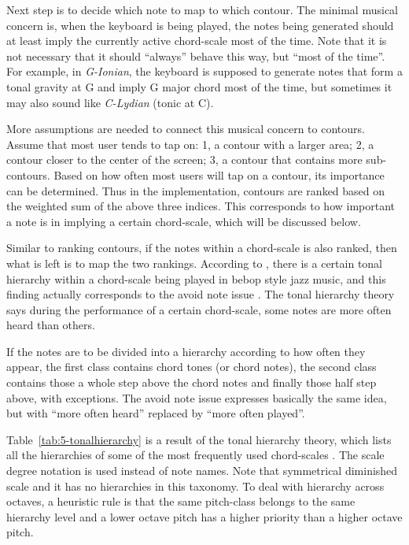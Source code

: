 Next step is to decide which note to map to which contour. The minimal musical concern is, when the keyboard is being played, the notes being generated should at least imply the currently active chord-scale most of the time. Note that it is not necessary that it should ``always'' behave this way, but ``most of the time''. For example, in \textit{G-Ionian}, the keyboard is supposed to generate notes that form a tonal gravity at G and imply G major chord most of the time, but sometimes it may also sound like \textit{C-Lydian} (tonic at C).

More assumptions are needed to connect this musical concern to contours. Assume that most user tends to tap on: 1, a contour with a larger area; 2, a contour closer to the center of the screen; 3, a contour that contains more sub-contours. Based on how often most users will tap on a contour, its importance can be determined. Thus in the implementation, contours are ranked based on the weighted sum of
the above three indices. This corresponds to how important a note is in implying a certain chord-scale, which will be discussed below.

Similar to ranking contours, if the notes within a chord-scale is also ranked, then what is left is to map the two rankings. According to \cite{jarvinen1995tonal}, there is a certain tonal hierarchy within a chord-scale being played in bebop style jazz music, and this finding actually corresponds to the avoid note issue \cite{nettles1987harmony}. The tonal hierarchy theory says during the performance of a certain chord-scale, some notes are more often heard than others.

If the notes are to be divided into a hierarchy according to how often they appear, the first class contains chord tones (or chord notes), the second class contains those a whole step above the chord notes and finally those half step above, with exceptions. The avoid note issue expresses basically the same idea, but with ``more often heard'' replaced by ``more often played''.

Table~\ref{tab:5-tonalhierarchy} is a result of the tonal hierarchy theory, which lists all the hierarchies \cite{nettles1987harmony} of some of the most frequently used chord-scales \cite{burtonJazzImpro}. The scale degree notation is
used instead of note names. Note that symmetrical diminished scale and it has no hierarchies in this taxonomy. To deal with hierarchy across octaves, a heuristic rule is that the same pitch-class belongs to the same hierarchy level and a lower octave pitch has a higher priority than a higher octave pitch.

